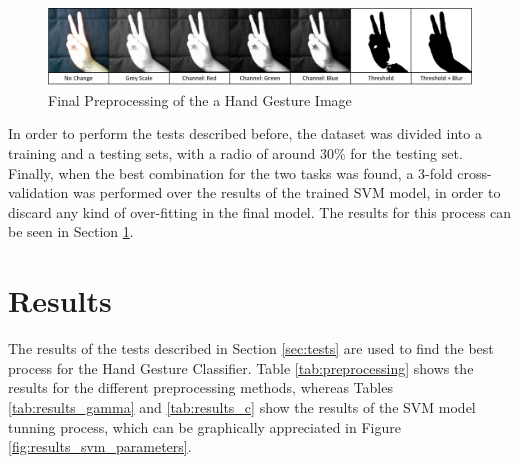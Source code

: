\documentclass[a4paper,10pt,english]{article}
\begin{document}
        \begin{figure}[h!]
            \centering
            \includegraphics[width=530pt]{images/test_preprocessing}
            \caption{Final Preprocessing of the a Hand Gesture Image} \label{fig:test_preprocessing}
        \end{figure}
                
        In order to perform the tests described before, the dataset was divided into a training and a testing sets, with a radio of around 30\% for the testing set. Finally, when the best combination for the two tasks was found, a 3-fold cross-validation was performed over the results of the trained SVM model, in order to discard any kind of over-fitting in the final model. The results for this process can be seen in Section \ref{sec:results}.
    
    \section{Results}\label{sec:results}
    
    The results of the tests described in Section \ref{sec:tests} are used to find the best process for the Hand Gesture Classifier. Table \ref{tab:preprocessing} shows the results for the different preprocessing methods, whereas Tables \ref{tab:results_gamma} and \ref{tab:results_c} show the results of the SVM model tunning process, which can be graphically appreciated in Figure \ref{fig:results_svm_parameters}.
\end{document}
